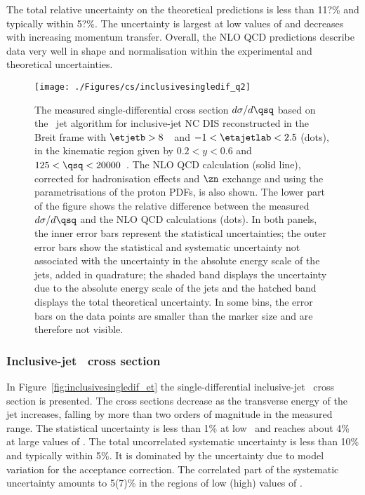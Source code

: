 The total relative uncertainty on the theoretical predictions is less than 11?\% and typically within 5?\%. The uncertainty is largest at low values of \qsq and decreases with increasing momentum transfer. Overall, the NLO QCD predictions describe data very well in shape and normalisation within the experimental and theoretical uncertainties.
\begin{figure}[p]
	\centering
		\texttt{[image: ./Figures/cs/inclusivesingledif\_q2]}
	\caption{The measured single-differential cross section $d\sigma/d\qsq$ based on the \kt~jet algorithm for inclusive-jet NC DIS reconstructed in the Breit frame with $\etjetb > 8$~\GeV~and $-1<\etajetlab<2.5$ (dots), in the kinematic region given by $0.2<y<0.6$ and $125 < \qsq < 20000$~\GeV. The NLO QCD calculation (solid line), corrected for hadronisation effects and $\zn$ exchange and using the  parametrisations of the proton PDFs, is also shown. The lower part of the figure shows the relative difference between the measured $d\sigma/d\qsq$ and the NLO QCD calculations (dots). In both panels, the inner error bars represent the statistical uncertainties; the outer error bars show the statistical and systematic uncertainty not associated with the uncertainty in the absolute energy scale of the jets, added in quadrature; the shaded band displays the uncertainty due to the absolute energy scale of the jets and the hatched band displays the total theoretical uncertainty. In some bins, the error bars on the data points are smaller than the marker size and are therefore not visible.} 
	\label{fig:inclusivesingledif_q2}
\end{figure}

\subsubsection*{Inclusive-jet \dsdetjetb~cross section}
In Figure~\ref{fig:inclusivesingledif_et} the single-differential inclusive-jet \dsdetjetb~cross section is presented. The cross sections decrease as the transverse energy of the jet increases, falling by more than two orders of magnitude in the measured range. The statistical uncertainty is less than 1\% at low \etjetb~and reaches about 4\% at large values of \etjetb. The total uncorrelated systematic uncertainty is less than 10\% and typically within 5\%. It is dominated by the uncertainty due to model variation for the acceptance correction. The correlated part of the systematic uncertainty amounts to 5(7)\%  in the regions of low (high) values of \etjetb.

